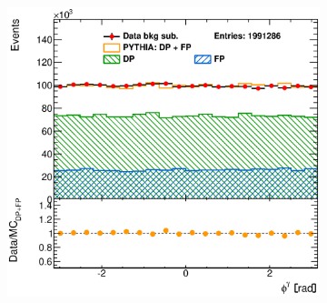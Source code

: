\documentclass[12pt, twoside]{article}
\numberwithin{equation}{section}
\numberwithin{figure}{section}
\newenvironment{changemargin}[2]{%
\begin{list}{}{%
\setlength{\topsep}{0pt}%
\setlength{\leftmargin}{#1}%
\setlength{\rightmargin}{#2}%
\setlength{\listparindent}{\parindent}%
\setlength{\itemindent}{\parindent}%
\setlength{\parsep}{\parskip}%
}%
\item[]}{\end{list}}
\begin{document}
\begin{figure}
\begin{changemargin}{-1.0cm}{-0.75cm}
\begin{changemargin}{-0.75cm}{-1.0cm}
\begin{subfigure}[b]{0.37\textwidth}
            \subcaption{}
            \label{fig:BSEtaPhotonPYTHIA}
        \end{subfigure}
        \begin{subfigure}[b]{0.37\textwidth}
            \includegraphics[width=\textwidth]{./images/BackgroundSubtractedPythia/SIG_EVENTS-103.eps}
            \subcaption{}
            \label{fig:BSPhiPhotonPYTHIA}
        \end{subfigure}


\end{changemargin}
\end{changemargin}
\end{figure}
\end{document}
